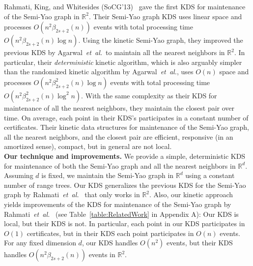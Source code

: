 \documentclass[11pt]{llncs}
\newcommand{\etal}{\emph{et~al.}}
\begin{document}
Rahmati, King, and Whitesides (SoCG'13)~\cite{socg17-rahmati} gave the first KDS for maintenance of the Semi-Yao graph in $\mathbb{R}^2$. Their Semi-Yao graph KDS uses linear space and processes $O(n^2\beta_{2s+2}(n))$ events with total processing time $O(n^2\beta_{2s+2}(n)\log n)$. Using the kinetic Semi-Yao graph, they improved the previous KDS by Agarwal~\etal~to maintain all the nearest neighbors in $\mathbb{R}^2$. In particular, their \textit{deterministic} kinetic algorithm, which is also arguably simpler than the randomized kinetic algorithm by Agarwal~\etal, uses $O(n)$ space and processes $O(n^2\beta_{2s+2}^2(n)\log n)$ events with total processing time $O(n^2\beta_{2s+2}^2(n)\log^2 n)$. With the same complexity as their KDS for maintenance of all the nearest neighbors, they maintain the closest pair over time. On average, each point in their KDS's participates in a constant number of certificates. Their kinetic data structures for maintenance of the Semi-Yao graph, all the nearest neighbors, and the closest pair are efficient, responsive (in an amortized sense), compact, but in general are not local.  
\vspace{+5pt}
\\
\textbf{Our technique and improvements.}
We provide a simple, deterministic KDS for maintenance of both the Semi-Yao graph and all the nearest neighbors in $\mathbb{R}^d$.  Assuming $d$ is fixed, we maintain the Semi-Yao graph in $\mathbb{R}^d$ using a constant number of range trees. Our KDS generalizes the previous KDS for the Semi-Yao graph by Rahmati~\etal~\cite{socg17-rahmati} that only works in $\mathbb{R}^2$. Also, our kinetic approach yields improvements of the KDS for maintenance of the Semi-Yao graph by Rahmati~\etal~\cite{socg17-rahmati} (see Table~\ref{table:RelatedWork} in Appendix A): Our KDS is local, but their KDS is not. In particular, each point in our KDS participates in $O(1)$ certificates, but  in their KDS each point participates in $O(n)$ events. For any fixed dimension $d$, our KDS handles $O(n^2)$ events, but their KDS handles $O(n^2\beta_{2s+2}(n))$ events in $\mathbb{R}^2$. 
\end{document}
